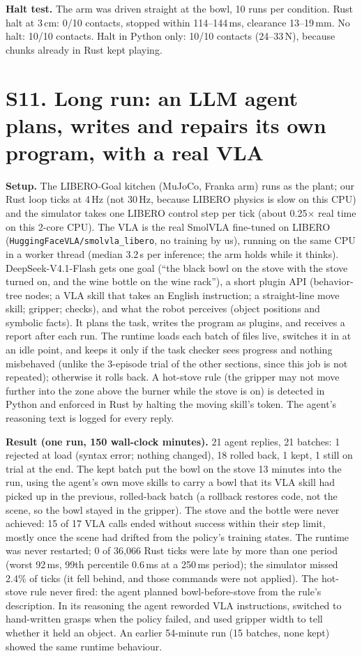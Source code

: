 \documentclass[10pt,letterpaper]{article}
\begin{document}
\textbf{Halt test.} The arm was driven straight at the bowl, 10 runs per condition. Rust halt at 3\,cm: 0/10 contacts, stopped within 114--144\,ms, clearance 13--19\,mm. No halt: 10/10 contacts. Halt in Python only: 10/10 contacts (24--33\,N), because chunks already in Rust kept playing.

\section*{S11. Long run: an LLM agent plans, writes and repairs its own program, with a real VLA}
\textbf{Setup.} The LIBERO-Goal kitchen (MuJoCo, Franka arm) runs as the plant; our Rust loop ticks at 4\,Hz (not 30\,Hz, because LIBERO physics is slow on this CPU) and the simulator takes one LIBERO control step per tick (about 0.25$\times$ real time on this 2-core CPU). The VLA is the real SmolVLA fine-tuned on LIBERO (\texttt{HuggingFaceVLA/smolvla\_libero}, no training by us), running on the same CPU in a worker thread (median 3.2\,s per inference; the arm holds while it thinks). DeepSeek-V4.1-Flash gets one goal (``the black bowl on the stove with the stove turned on, and the wine bottle on the wine rack''), a short plugin API (behavior-tree nodes; a VLA skill that takes an English instruction; a straight-line move skill; gripper; checks), and what the robot perceives (object positions and symbolic facts). It plans the task, writes the program as plugins, and receives a report after each run. The runtime loads each batch of files live, switches it in at an idle point, and keeps it only if the task checker sees progress and nothing misbehaved (unlike the 3-episode trial of the other sections, since this job is not repeated); otherwise it rolls back. A hot-stove rule (the gripper may not move further into the zone above the burner while the stove is on) is detected in Python and enforced in Rust by halting the moving skill's token. The agent's reasoning text is logged for every reply.

\textbf{Result (one run, 150 wall-clock minutes).} 21 agent replies, 21 batches: 1 rejected at load (syntax error; nothing changed), 18 rolled back, 1 kept, 1 still on trial at the end. The kept batch put the bowl on the stove 13 minutes into the run, using the agent's own move skills to carry a bowl that its VLA skill had picked up in the previous, rolled-back batch (a rollback restores code, not the scene, so the bowl stayed in the gripper). The stove and the bottle were never achieved: 15 of 17 VLA calls ended without success within their step limit, mostly once the scene had drifted from the policy's training states. The runtime was never restarted; 0 of 36{,}066 Rust ticks were late by more than one period (worst 92\,ms, 99th percentile 0.6\,ms at a 250\,ms period); the simulator missed 2.4\% of ticks (it fell behind, and those commands were not applied). The hot-stove rule never fired: the agent planned bowl-before-stove from the rule's description. In its reasoning the agent reworded VLA instructions, switched to hand-written grasps when the policy failed, and used gripper width to tell whether it held an object. An earlier 54-minute run (15 batches, none kept) showed the same runtime behaviour.
\end{document}
